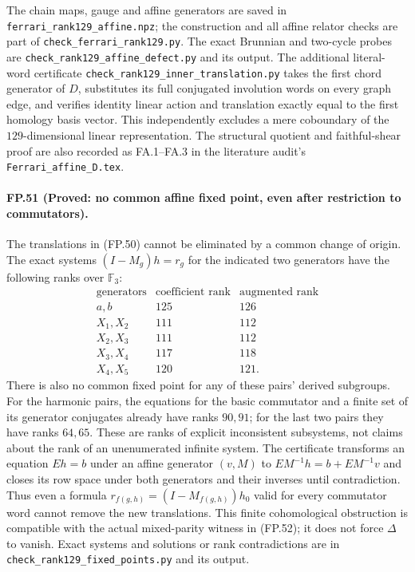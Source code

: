 The chain maps, gauge and affine generators are saved in
\texttt{ferrari\_rank129\_affine.npz}; the construction and
all affine relator checks are part of
\texttt{check\_ferrari\_rank129.py}. The exact Brunnian and
two-cycle probes are
\texttt{check\_rank129\_affine\_defect.py} and its output.
The additional literal-word certificate
\texttt{check\_rank129\_inner\_translation.py} takes the
first chord generator of $D$, substitutes its full conjugated
involution words on every graph edge, and verifies identity
linear action and translation exactly equal to the first
homology basis vector. This independently excludes a mere
coboundary of the $129$-dimensional linear representation.
The structural quotient and faithful-shear proof are also
recorded as FA.1--FA.3 in the literature audit's
\texttt{Ferrari\_affine\_D.tex}.

\paragraph{FP.51 (Proved: no common affine fixed point, even after restriction to commutators).}
The translations in (FP.50) cannot be eliminated by a common
change of origin. The exact systems
$(I-M_g)h=r_g$ for the indicated two generators have the
following ranks over $\mathbb F_3$:
\[
\begin{array}{c|c|c}
 \text{generators}&\text{coefficient rank}&\text{augmented rank}\\\hline
 a,b&125&126\\
 X_1,X_2&111&112\\
 X_2,X_3&111&112\\
 X_3,X_4&117&118\\
 X_4,X_5&120&121.
\end{array}
\]
There is also no common fixed point for any of these pairs'
derived subgroups. For the harmonic pairs, the equations for
the basic commutator and a finite set of its generator
conjugates already have ranks $90,91$; for the last two
pairs they have ranks $64,65$.
These are ranks of explicit inconsistent subsystems, not
claims about the rank of an unenumerated infinite system.
The certificate transforms an equation $Eh=b$ under an
affine generator $(v,M)$ to
$EM^{-1}h=b+EM^{-1}v$ and closes its row space under both
generators and their inverses until contradiction.
Thus even a formula $r_{f(g,h)}=(I-M_{f(g,h)})h_0$ valid
for every commutator word cannot remove the new translations.
This finite cohomological obstruction is compatible with the
actual mixed-parity witness in (FP.52); it does not force
$\Delta$ to vanish. Exact systems and solutions or rank
contradictions are in
\texttt{check\_rank129\_fixed\_points.py} and its output.

